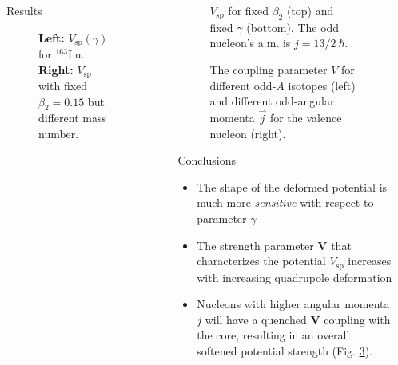\documentclass[final]{beamer}
\newlength{\sepwidth}
\newlength{\colwidth}
\newcommand{\separatorcolumn}{\begin{column}{\sepwidth}\end{column}}
\begin{document}
\begin{frame}[t]
\begin{columns}[t]
\begin{column}{\colwidth}
\begin{block}{Results}
\begin{figure}
\begin{minipage}{.5\textwidth}
  \centering
\end{minipage}
     \caption{\textbf{Left:} $V_\text{sp}(\gamma)$ for $^{163}$Lu. \textbf{Right:} $V_\text{sp}$ with fixed $\beta_2=0.15$ but different mass number.}
     \label{vsp-behavior-gamma}
 \end{figure}
  \end{block}
\end{column}
\separatorcolumn
\begin{column}{\colwidth}
 \begin{figure}
     \centering
     
     \caption{$V_\text{sp}$ for fixed $\beta_2$ (top) and fixed $\gamma$ (bottom). The odd nucleon's a.m. is $j=13/2\ \hbar$.}
     \label{gamma-beta-dev-v}
 \end{figure}
 \begin{figure}
     \centering
     \caption{The coupling parameter $V$ for different odd-$A$ isotopes (left) and different odd-angular momenta $\vec{j}$ for the valence nucleon (right).}
     \label{v-param}
 \end{figure}
    \begin{block}{Conclusions}
    \begin{itemize}
    \item The shape of the deformed potential is much more \emph{sensitive} with respect to  parameter $\gamma$
    \item The strength parameter $\mathbf{V}$ that characterizes the potential $V_\text{sp}$ increases with increasing quadrupole deformation
    \item Nucleons with higher angular momenta $j$ will have a quenched $\mathbf{V}$ coupling with the core, resulting in an overall softened potential strength (Fig. \ref{v-param}).
    \end{itemize}
  \end{block}


\end{column}

\separatorcolumn

\end{columns}

\end{frame}
\end{document}
